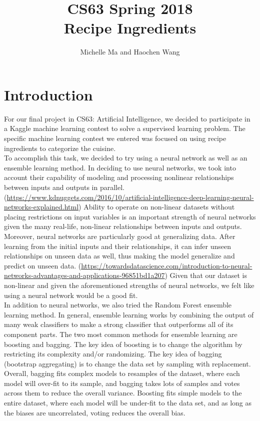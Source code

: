 \documentclass[11pt]{article}
\title{CS63 Spring 2018\\Recipe Ingredients}
\author{Michelle Ma and Haochen Wang}
\date{}
\begin{document}
\maketitle

\section{Introduction}

For our final project in CS63: Artificial Intelligence, we decided to participate
in a Kaggle machine learning contest to solve a supervised learning problem. The
specific machine learning contest we entered was focused on using recipe ingredients
to categorize the cuisine. \\

To accomplish this task, we decided to try using a neural network as well as
an ensemble learning method. In deciding to use neural networks, we took into
account their capability of modeling and processing nonlinear relationships between
inputs and outputs in parallel.
(\url{https://www.kdnuggets.com/2016/10/artificial-intelligence-deep-learning-neural-networks-explained.html})
Ability to operate on non-linear datasets without placing restrictions on input variables
is an important strength of neural networks
given the many real-life, non-linear relationships between inputs and outputs. Moreover,
neural networks are particularly good at generalizing data. After learning from
the initial inputs and their relationships, it can infer unseen relationships on
unseen data as well, thus making the model generalize and predict on unseen data.
(\url{https://towardsdatascience.com/introduction-to-neural-networks-advantages-and-applications-96851bd1a207})
Given that our dataset is non-linear and given the aforementioned strengths of
neural networks, we felt like using a neural network would be a good fit.\\

In addition to neural networks, we also tried the Random Forest ensemble
learning method. In general, ensemble learning works by combining the output
of many weak classifiers to make a strong classifier that outperforms all of
its component parts. The two most common methods for ensemble learning are
boosting and bagging. The key idea of boosting is to change the algorithm
by restricting its complexity and/or randomizing. The key idea of bagging (bootstrap
aggregating) is to change the data set by sampling with replacement. Overall,
bagging fits complex models to resamples of the dataset, where each model will
over-fit to its sample, and bagging takes lots of samples and votes across them
to reduce the overall variance. Boosting fits simple models to the entire
dataset, where each model will be under-fit to the data set, and as long as
the biases are uncorrelated, voting reduces the overall bias. \\
\end{document}
